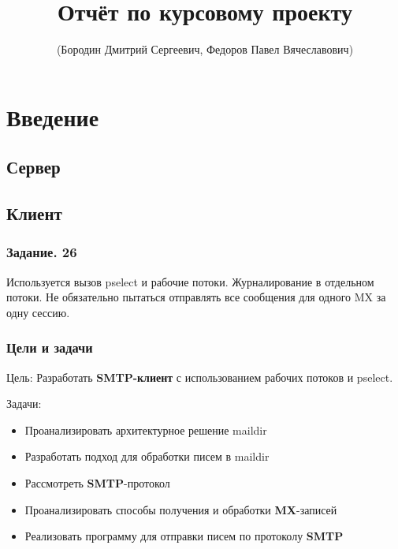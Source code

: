 \documentclass[a4paper,12pt]{report}
\title{Отчёт по курсовому проекту}
\author{(Бородин Дмитрий Сергеевич, Федоров Павел Вячеславович)}
\begin{document}
\maketitle

\tableofcontents

\chapter*{Введение}

\section*{Сервер}

\section*{Клиент}

\subsection*{Задание. 26}
Используется вызов pselect и рабочие потоки. Журналирование в отдельном потоки. Не обязательно пытаться отправлять все сообщения для одного MX за одну сессию.
\subsection*{Цели и задачи}
Цель: 
    Разработать \textbf{SMTP-клиент} с использованием рабочих потоков и pselect.

Задачи:
\begin{itemize}
    \item Проанализировать архитектурное решение maildir
    \item Разработать подход для обработки писем в maildir 
    \item Рассмотреть \textbf{SMTP}-протокол
    \item Проанализировать способы получения и обработки \textbf{MX}-записей
    \item Реализовать программу для отправки писем по протоколу \textbf{SMTP}
\end{itemize}





\end{document}
